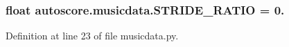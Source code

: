 \subsubsection[{\texorpdfstring{S\+T\+R\+I\+D\+E\+\_\+\+R\+A\+T\+IO}{STRIDE_RATIO}}]{\setlength{\rightskip}{0pt plus 5cm}float autoscore.\+musicdata.\+S\+T\+R\+I\+D\+E\+\_\+\+R\+A\+T\+IO = 0.}\hypertarget{namespaceautoscore_1_1musicdata_abf4865a17c78985e607f4f7e2b9f5e62}{}\label{namespaceautoscore_1_1musicdata_abf4865a17c78985e607f4f7e2b9f5e62}


Definition at line 23 of file musicdata.\+py.

